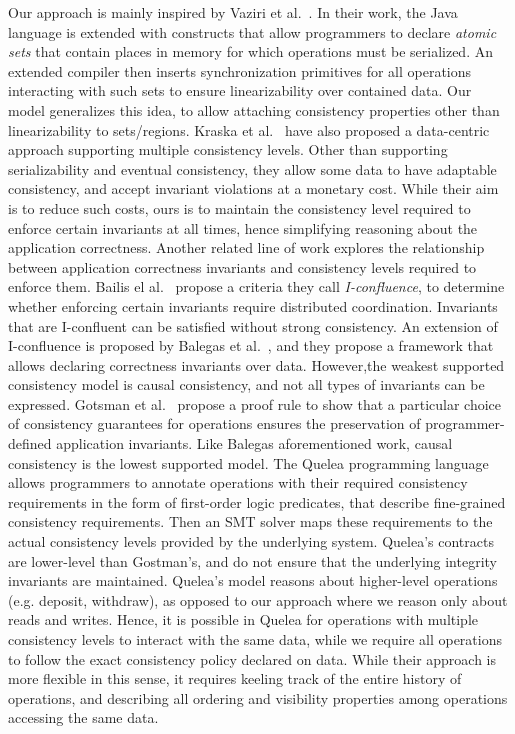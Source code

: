\documentclass[preprint,numbers]{sigplanconf}
\begin{document}
Our approach is mainly inspired by Vaziri et al.~\cite{dolby2012data}. In their work, 
the Java language is extended with constructs that allow programmers to declare
\emph{atomic sets} that contain places in memory for which operations must be
serialized. An extended compiler then inserts synchronization primitives for all
operations interacting with such sets to ensure linearizability over contained
data. Our model generalizes this idea, to allow attaching consistency
properties other than linearizability to sets/regions.
Kraska et al.~\cite{kraska2009consistency} have also proposed a data-centric
approach supporting multiple consistency levels. Other than supporting
serializability and eventual consistency, they allow some data to have adaptable consistency, and
accept invariant violations at a monetary cost. While their aim is to reduce
such costs, ours is to maintain the consistency level required to enforce
certain invariants at all times, hence simplifying reasoning about the application
correctness. Another related line of work explores the relationship between
application correctness invariants and consistency levels required to enforce them.
Bailis el al.~\cite{bailis2014coordination} propose a criteria they call
\emph{I-confluence}, to determine whether enforcing certain invariants require distributed
coordination. Invariants that are I-confluent can be satisfied without strong
consistency. 
An extension of I-confluence is proposed by Balegas et
al.~\cite{balegas2015putting}, and they propose a framework that allows declaring
correctness invariants over data. However,the weakest supported consistency
model is causal consistency, and not all types of invariants can be
expressed.
Gotsman et al.~\cite{gotsman2016cause} propose a proof rule to show that a 
particular choice of consistency guarantees for operations
ensures the preservation of programmer-defined application invariants. Like
Balegas aforementioned work, causal consistency is the lowest supported model.
The Quelea programming language~\cite{sivaramakrishnan2015declarative} allows
programmers to annotate operations with their required consistency requirements
in the form of first-order logic predicates, that describe fine-grained consistency
requirements. Then an SMT solver maps these requirements to the actual
consistency levels provided by the underlying system. Quelea's contracts are
lower-level than Gostman's, and do not ensure that the underlying integrity
invariants are maintained. Quelea's model reasons about higher-level
operations (e.g. deposit, withdraw), as opposed to our approach where we reason 
only about reads and writes. Hence, it is possible in Quelea for operations with
multiple consistency levels to interact with the same data, while we require all 
operations to follow the exact consistency policy declared on data. While their 
approach is more flexible in this sense, it requires keeling track of the entire
history of operations, and describing all ordering and visibility properties among 
operations accessing the same data.
\end{document}
